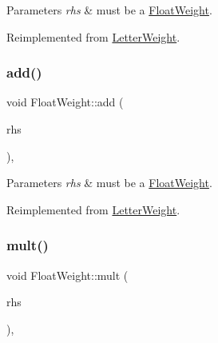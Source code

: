 \begin{DoxyParams}{Parameters}
{\em rhs} & must be a \mbox{\hyperlink{classFloatWeight}{Float\+Weight}}. \\
\hline
\end{DoxyParams}


Reimplemented from \mbox{\hyperlink{group__weight_ga0ef9dd9bcd765c0e3c50b384b34d88d2}{Letter\+Weight}}.

\mbox{\label{group__weight_ga987ee2a0704f046a9be6e2456d56df7c}} 
\subsubsection{\texorpdfstring{add()}{add()}\hspace{0.1cm}{\footnotesize\ttfamily [2/5]}}
{\footnotesize\ttfamily void Float\+Weight\+::add (\begin{DoxyParamCaption}\item[{const \mbox{\hyperlink{classLetterWeight}{Letter\+Weight}} $\ast$}]{rhs }\end{DoxyParamCaption})\hspace{0.3cm}{\ttfamily [protected]}, {\ttfamily [virtual]}}


\begin{DoxyParams}{Parameters}
{\em rhs} & must be a \mbox{\hyperlink{classFloatWeight}{Float\+Weight}}. \\
\hline
\end{DoxyParams}


Reimplemented from \mbox{\hyperlink{group__weight_ga49b09c8f364a2ebf1d154f606d9aaea8}{Letter\+Weight}}.

\mbox{\label{group__weight_ga16591d6a01c98477ccd57deadf8d4738}} 
\subsubsection{\texorpdfstring{mult()}{mult()}\hspace{0.1cm}{\footnotesize\ttfamily [2/5]}}
{\footnotesize\ttfamily void Float\+Weight\+::mult (\begin{DoxyParamCaption}\item[{const \mbox{\hyperlink{classLetterWeight}{Letter\+Weight}} $\ast$}]{rhs }\end{DoxyParamCaption})\hspace{0.3cm}{\ttfamily [protected]}, {\ttfamily [virtual]}}


